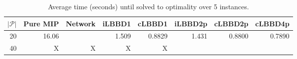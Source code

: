 \begin{table*}
    \centering
    \caption{Average time (seconds) until solved to optimality over 5 instances.}
    \begin{tabular}{rrrrrrrr} \toprule
        $|\mathcal{P}|$ & Pure MIP & Network & iLBBD1 & cLBBD1 & iLBBD2p & cLBBD2p & cLBBD4p \\ \midrule
        20              & 16.06 &         & 1.509 &  0.8829 & 1.431 & 0.8800 & 0.7890 \\
        40              & X   & X     &   X       & X \\
        \bottomrule
    \end{tabular}
\end{table*}
